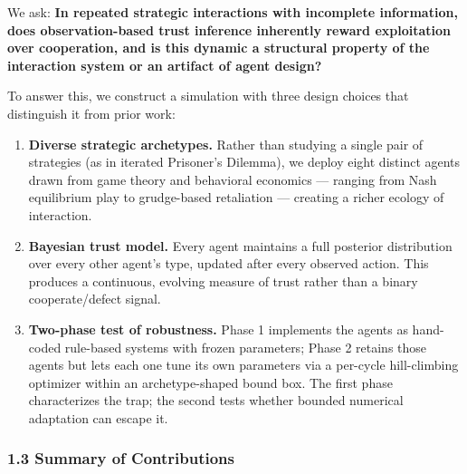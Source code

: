 \documentclass[
]{article}
\begin{document}
We ask: \textbf{In repeated strategic interactions with incomplete
information, does observation-based trust inference inherently reward
exploitation over cooperation, and is this dynamic a structural property
of the interaction system or an artifact of agent design?}

To answer this, we construct a simulation with three design choices that
distinguish it from prior work:

\begin{enumerate}
\def\labelenumi{\arabic{enumi}.}
\item
  \textbf{Diverse strategic archetypes.} Rather than studying a single
  pair of strategies (as in iterated Prisoner's Dilemma), we deploy
  eight distinct agents drawn from game theory and behavioral economics
  --- ranging from Nash equilibrium play to grudge-based retaliation ---
  creating a richer ecology of interaction.
\item
  \textbf{Bayesian trust model.} Every agent maintains a full posterior
  distribution over every other agent's type, updated after every
  observed action. This produces a continuous, evolving measure of trust
  rather than a binary cooperate/defect signal.
\item
  \textbf{Two-phase test of robustness.} Phase 1 implements the agents
  as hand-coded rule-based systems with frozen parameters; Phase 2
  retains those agents but lets each one tune its own parameters via a
  per-cycle hill-climbing optimizer within an archetype-shaped bound
  box. The first phase characterizes the trap; the second tests whether
  bounded numerical adaptation can escape it.
\end{enumerate}

\hypertarget{summary-of-contributions}{%
\subsubsection{1.3 Summary of
Contributions}\label{summary-of-contributions}}
\end{document}
